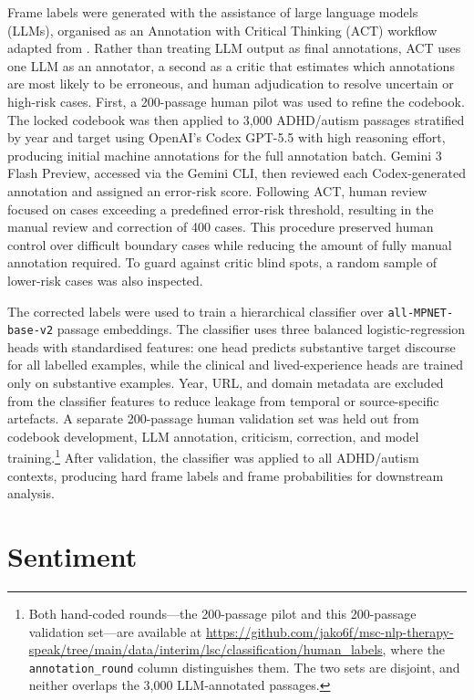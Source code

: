 Frame labels were generated with the assistance of large language models (LLMs), organised as an Annotation with Critical Thinking (ACT) workflow adapted from \citet{linACTHumanMultimodal2025}. Rather than treating LLM output as final annotations, ACT uses one LLM as an annotator, a second as a critic that estimates which annotations are most likely to be erroneous, and human adjudication to resolve uncertain or high-risk cases. First, a 200-passage human pilot was used to refine the codebook. The locked codebook was then applied to 3,000 ADHD/autism passages stratified by year and target using OpenAI's Codex GPT-5.5 with high reasoning effort, producing initial machine annotations for the full annotation batch. Gemini 3 Flash Preview, accessed via the Gemini CLI, then reviewed each Codex-generated annotation and assigned an error-risk score. Following ACT, human review focused on cases exceeding a predefined error-risk threshold, resulting in the manual review and correction of 400 cases. This procedure preserved human control over difficult boundary cases while reducing the amount of fully manual annotation required. To guard against critic blind spots, a random sample of lower-risk cases was also inspected.

The corrected labels were used to train a hierarchical classifier over \texttt{all-MPNET-base-v2} passage embeddings. The classifier uses three balanced logistic-regression heads with standardised features: one head predicts substantive target discourse for all labelled examples, while the clinical and lived-experience heads are trained only on substantive examples. Year, URL, and domain metadata are excluded from the classifier features to reduce leakage from temporal or source-specific artefacts. A separate 200-passage human validation set was held out from codebook development, LLM annotation, criticism, correction, and model training.\footnote{Both hand-coded rounds---the 200-passage pilot and this 200-passage validation set---are available at \url{https://github.com/jako6f/msc-nlp-therapy-speak/tree/main/data/interim/lsc/classification/human_labels}, where the \texttt{annotation\_round} column distinguishes them. The two sets are disjoint, and neither overlaps the 3,000 LLM-annotated passages.} After validation, the classifier was applied to all ADHD/autism contexts, producing hard frame labels and frame probabilities for downstream analysis.

\section{Sentiment}

